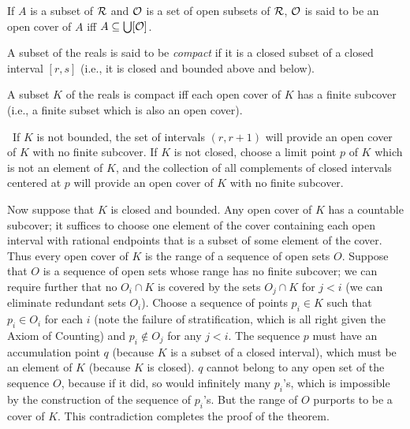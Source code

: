 \begin{definition}
 If $A$ is a subset of $\cal R$ and $\cal O$ is a
 set of open subsets of $\cal R$, $\cal O$ is said to be an {\upshape open
 cover} of $A$ iff $A \subseteq \bigcup[{\cal O}]$.
\end{definition}

\begin{definition}
 A subset of the reals is said to be {\em compact}
 if it is a closed subset of a closed interval $[r,s]$ (i.e., it is
 closed and bounded above and below).
\end{definition}

\begin{thm}
 A subset $K$ of the reals is compact iff each open
 cover of $K$ has a finite subcover (i.e., a finite
 subset which is also an open cover).
\end{thm}

\preuve\ If $K$ is not bounded, the set of intervals $(r,r+1)$
will provide an open cover of $K$ with no finite subcover.  If $K$ is
not closed, choose a limit point $p$ of $K$ which is not an element of
$K$, and the collection of all complements of closed
intervals centered at $p$ will provide an open cover of $K$ with no finite
subcover.

Now suppose that $K$ is closed and bounded.  Any open cover of $K$ has
a countable subcover; it suffices to choose one element of the
cover containing each open interval with rational
endpoints that is a subset of some element of the cover.  Thus every open cover
of $K$ is the range of a sequence of open sets $O$. Suppose
that $O$ is a sequence of open sets whose range has no finite subcover; we can
require further that no $O_i \cap K$ is covered by the sets $O_j \cap K$ for
$j < i$ (we can eliminate redundant sets $O_i$).  Choose a sequence of
points $p_i \in K$ such that $p_i \in O_i$ for each $i$ (note the
failure of stratification, which is all right given the
Axiom of Counting) and $p_i \not\in O_j$ for any
$j<i$.  The sequence $p$ must have an accumulation point $q$ (because $K$ is a
subset of a closed interval), which must be an element of $K$ (because $K$ is
closed). $q$ cannot belong to any open set of the sequence $O$, because if it
did, so would infinitely many $p_i$'s, which is impossible by the
construction of the sequence of $p_i$'s.  But the range of $O$
purports to be a cover of $K$.  This contradiction completes the proof
of the theorem.
\finpreuve

